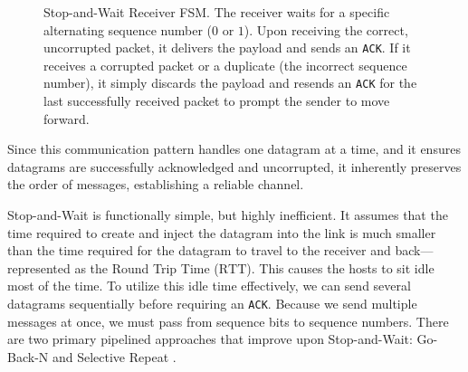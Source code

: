 \begin{figure}[htbp]
    \centering
    \caption{Stop-and-Wait Receiver FSM. The receiver waits for a specific alternating sequence number (\(0\) or \(1\)). Upon receiving the correct, uncorrupted packet, it delivers the payload and sends an \texttt{ACK}. If it receives a corrupted packet or a duplicate (the incorrect sequence number), it simply discards the payload and resends an \texttt{ACK} for the last successfully received packet to prompt the sender to move forward.}
\end{figure}

Since this communication pattern handles one datagram at a time, and it ensures datagrams are successfully acknowledged and uncorrupted, it inherently preserves the order of messages, establishing a reliable channel.

Stop-and-Wait is functionally simple, but highly inefficient.
It assumes that the time required to create and inject the datagram into the link is much smaller than the time required for the datagram to travel to the receiver and back---represented as the Round Trip Time (\( \text{RTT} \)).
This causes the hosts to sit idle most of the time. To utilize this idle time effectively, we can send several datagrams sequentially before requiring an \texttt{ACK}.
Because we send multiple messages at once, we must pass from sequence bits to sequence numbers.
There are two primary pipelined approaches that improve upon Stop-and-Wait: Go-Back-N and Selective Repeat \cite{kurose2017}.

